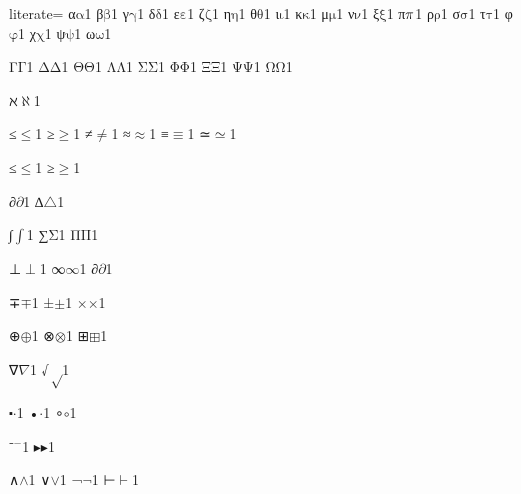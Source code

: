 {%
literate=
{α}{{\ensuremath{\mathrm{\alpha}}}}1
{β}{{\ensuremath{\mathrm{\beta}}}}1
{γ}{{\ensuremath{\mathrm{\gamma}}}}1
{δ}{{\ensuremath{\mathrm{\delta}}}}1
{ε}{{\ensuremath{\mathrm{\varepsilon}}}}1
{ζ}{{\ensuremath{\mathrm{\zeta}}}}1
{η}{{\ensuremath{\mathrm{\eta}}}}1
{θ}{{\ensuremath{\mathrm{\theta}}}}1
{ι}{{\ensuremath{\mathrm{\iota}}}}1
{κ}{{\ensuremath{\mathrm{\kappa}}}}1
{μ}{{\ensuremath{\mathrm{\mu}}}}1
{ν}{{\ensuremath{\mathrm{\nu}}}}1
{ξ}{{\ensuremath{\mathrm{\xi}}}}1
{π}{{\ensuremath{\mathrm{\mathnormal{\pi}}}}}1
{ρ}{{\ensuremath{\mathrm{\rho}}}}1
{σ}{{\ensuremath{\mathrm{\sigma}}}}1
{τ}{{\ensuremath{\mathrm{\tau}}}}1
{φ}{{\ensuremath{\mathrm{\varphi}}}}1
{χ}{{\ensuremath{\mathrm{\chi}}}}1
{ψ}{{\ensuremath{\mathrm{\psi}}}}1
{ω}{{\ensuremath{\mathrm{\omega}}}}1

{Γ}{{\ensuremath{\mathrm{\Gamma}}}}1
{Δ}{{\ensuremath{\mathrm{\Delta}}}}1
{Θ}{{\ensuremath{\mathrm{\Theta}}}}1
{Λ}{{\ensuremath{\mathrm{\Lambda}}}}1
{Σ}{{\ensuremath{\mathrm{\Sigma}}}}1
{Φ}{{\ensuremath{\mathrm{\Phi}}}}1
{Ξ}{{\ensuremath{\mathrm{\Xi}}}}1
{Ψ}{{\ensuremath{\mathrm{\Psi}}}}1
{Ω}{{\ensuremath{\mathrm{\Omega}}}}1

{ℵ}{{\ensuremath{\aleph}}}1

{≤}{{\ensuremath{\leq}}}1
{≥}{{\ensuremath{\geq}}}1
{≠}{{\ensuremath{\neq}}}1
{≈}{{\ensuremath{\approx}}}1
{≡}{{\ensuremath{\equiv}}}1
{≃}{{\ensuremath{\simeq}}}1

{≤}{{\ensuremath{\leq}}}1
{≥}{{\ensuremath{\geq}}}1

{∂}{{\ensuremath{\partial}}}1
{∆}{{\ensuremath{\triangle}}}1 %

{∫}{{\ensuremath{\int}}}1
{∑}{{\ensuremath{\mathrm{\Sigma}}}}1
{Π}{{\ensuremath{\mathrm{\Pi}}}}1

{⊥}{{\ensuremath{\perp}}}1
{∞}{{\ensuremath{\infty}}}1
{∂}{{\ensuremath{\partial}}}1

{∓}{{\ensuremath{\mp}}}1
{±}{{\ensuremath{\pm}}}1
{×}{{\ensuremath{\times}}}1

{⊕}{{\ensuremath{\oplus}}}1
{⊗}{{\ensuremath{\otimes}}}1
{⊞}{{\ensuremath{\boxplus}}}1

{∇}{{\ensuremath{\nabla}}}1
{√}{{\ensuremath{\sqrt}}}1

{⬝}{{\ensuremath{\cdot}}}1
{•}{{\ensuremath{\cdot}}}1
{∘}{{\ensuremath{\circ}}}1

{⁻}{{\ensuremath{^{-}}}}1
{▸}{{\ensuremath{\blacktriangleright}}}1

{∧}{{\ensuremath{\wedge}}}1
{∨}{{\ensuremath{\vee}}}1
{¬}{{\ensuremath{\neg}}}1
{⊢}{{\ensuremath{\vdash}}}1

}
